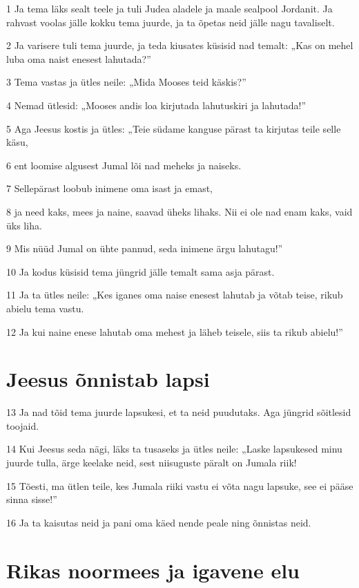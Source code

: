 \par 1 Ja tema läks sealt teele ja tuli Judea aladele ja maale sealpool Jordanit. Ja rahvast voolas jälle kokku tema juurde, ja ta õpetas neid jälle nagu tavaliselt.
\par 2 Ja varisere tuli tema juurde, ja teda kiusates küsisid nad temalt: „Kas on mehel luba oma naist enesest lahutada?”
\par 3 Tema vastas ja ütles neile: „Mida Mooses teid käskis?”
\par 4 Nemad ütlesid: „Mooses andis loa kirjutada lahutuskiri ja lahutada!”
\par 5 Aga Jeesus kostis ja ütles: „Teie südame kanguse pärast ta kirjutas teile selle käsu,
\par 6 ent loomise algusest Jumal lõi nad meheks ja naiseks.
\par 7 Sellepärast loobub inimene oma isast ja emast,
\par 8 ja need kaks, mees ja naine, saavad üheks lihaks. Nii ei ole nad enam kaks, vaid üks liha.
\par 9 Mis nüüd Jumal on ühte pannud, seda inimene ärgu lahutagu!”
\par 10 Ja kodus küsisid tema jüngrid jälle temalt sama asja pärast.
\par 11 Ja ta ütles neile: „Kes iganes oma naise enesest lahutab ja võtab teise, rikub abielu tema vastu.
\par 12 Ja kui naine enese lahutab oma mehest ja läheb teisele, siis ta rikub abielu!”

\section*{Jeesus õnnistab lapsi}

\par 13 Ja nad tõid tema juurde lapsukesi, et ta neid puudutaks. Aga jüngrid sõitlesid toojaid.
\par 14 Kui Jeesus seda nägi, läks ta tusaseks ja ütles neile: „Laske lapsukesed minu juurde tulla, ärge keelake neid, sest niisuguste päralt on Jumala riik!
\par 15 Tõesti, ma ütlen teile, kes Jumala riiki vastu ei võta nagu lapsuke, see ei pääse sinna sisse!”
\par 16 Ja ta kaisutas neid ja pani oma käed nende peale ning õnnistas neid.

\section*{Rikas noormees ja igavene elu}

